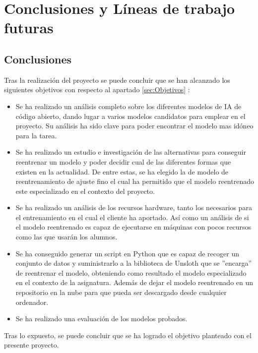 \chapter{Conclusiones y Líneas de trabajo futuras}

\section{Conclusiones}

Tras la realización del proyecto se puede concluir que se han alcanzado los siguientes objetivos con respecto al apartado \ref{sec:Objetivos} :

\begin{itemize}
    \item Se ha realizado un análisis completo sobre los diferentes modelos de IA de código abierto, dando lugar a varios modelos candidatos para emplear en el proyecto. Su análisis ha sido clave para poder encontrar el modelo mas idóneo para la tarea.
    
    \item Se ha realizado un estudio e investigación de las alternativas para conseguir reentrenar un modelo y poder decidir cual de las diferentes formas que existen en la actualidad. De entre estas, se ha elegido la de modelo de reentrenamiento de ajuste fino el cual ha permitido que el modelo reentrenado este especializado en el contexto del proyecto.
    
    \item Se ha realizado un análisis de los recursos hardware, tanto los necesarios para el entrenamiento en el cual el cliente ha aportado. Así como un análisis de si el modelo reentrenado es capaz de ejecutarse en máquinas con pocos recursos como las que usarán los alumnos.
    
    \item Se ha conseguido generar un script en Python que es capaz de recoger un conjunto de datos y suministrarlo a la biblioteca de Unsloth que se ''encarga'' de reentrenar el modelo, obteniendo como resultado el modelo especializado en el contexto de la asignatura. Además de dejar el modelo reentrenado en un repositorio en la nube para que pueda ser descargado desde cualquier ordenador.
    
    \item Se ha realizado una evaluación de los modelos probados.
\end{itemize}

Tras lo expuesto, se puede concluir que se ha logrado el objetivo planteado con el presente proyecto.

